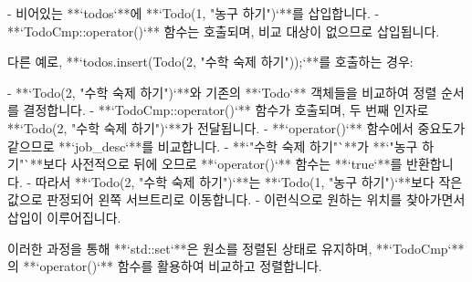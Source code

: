 - 비어있는 **`todos`**에 **`Todo(1, "농구 하기")`**를 삽입합니다.
- **`TodoCmp::operator()`** 함수는 호출되며, 비교 대상이 없으므로 삽입됩니다.

다른 예로, **`todos.insert(Todo(2, "수학 숙제 하기"));`**를 호출하는 경우:

- **`Todo(2, "수학 숙제 하기")`**와 기존의 **`Todo`** 객체들을 비교하여 정렬 순서를 결정합니다.
- **`TodoCmp::operator()`** 함수가 호출되며, 두 번째 인자로 **`Todo(2, "수학 숙제 하기")`**가 전달됩니다.
- **`operator()`** 함수에서 중요도가 같으므로 **`job_desc`**를 비교합니다.
- **`"수학 숙제 하기"`**가 **`"농구 하기"`**보다 사전적으로 뒤에 오므로 **`operator()`** 함수는 **`true`**를 반환합니다.
- 따라서 **`Todo(2, "수학 숙제 하기")`**는 **`Todo(1, "농구 하기")`**보다 작은 값으로 판정되어 왼쪽 서브트리로 이동합니다.
- 이런식으로 원하는 위치를 찾아가면서 삽입이 이루어집니다.

이러한 과정을 통해 **`std::set`**은 원소를 정렬된 상태로 유지하며, **`TodoCmp`**의 **`operator()`** 함수를 활용하여 비교하고 정렬합니다.